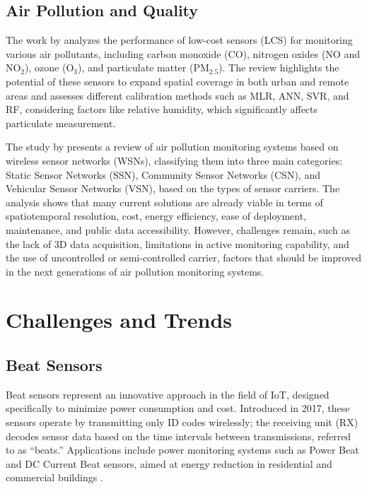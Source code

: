 \documentclass[conference]{IEEEtran}
\begin{document}
\subsection{Air Pollution and Quality}

The work by \cite{karagulian_2019_review} analyzes the performance of low-cost sensors (LCS) for monitoring various air pollutants, including carbon monoxide (CO), nitrogen oxides (NO and NO$_2$), ozone (O$_3$), and particulate matter (PM$_{2.5}$). The review highlights the potential of these sensors to expand spatial coverage in both urban and remote areas and assesses different calibration methods such as MLR, ANN, SVR, and RF, considering factors like relative humidity, which significantly affects particulate measurement.

The study by \cite{yi_2015_a} presents a review of air pollution monitoring systems based on wireless sensor networks (WSNs), classifying them into three main categories: Static Sensor Networks (SSN), Community Sensor Networks (CSN), and Vehicular Sensor Networks (VSN), based on the types of sensor carriers. The analysis shows that many current solutions are already viable in terms of spatiotemporal resolution, cost, energy efficiency, ease of deployment, maintenance, and public data accessibility. However, challenges remain, such as the lack of 3D data acquisition, limitations in active monitoring capability, and the use of uncontrolled or semi-controlled carrier, factors that should be improved in the next generations of air pollution monitoring systems.

\section{Challenges and Trends} \label{cap:challenges}

\subsection{Beat Sensors}

Beat sensors represent an innovative approach in the field of IoT, designed specifically to minimize power consumption and cost. Introduced in 2017, these sensors operate by transmitting only ID codes wirelessly; the receiving unit (RX) decodes sensor data based on the time intervals between transmissions, referred to as “beats.” Applications include power monitoring systems such as Power Beat and DC Current Beat sensors, aimed at energy reduction in residential and commercial buildings \cite{ishibashi_2017_beat}.
\end{document}
